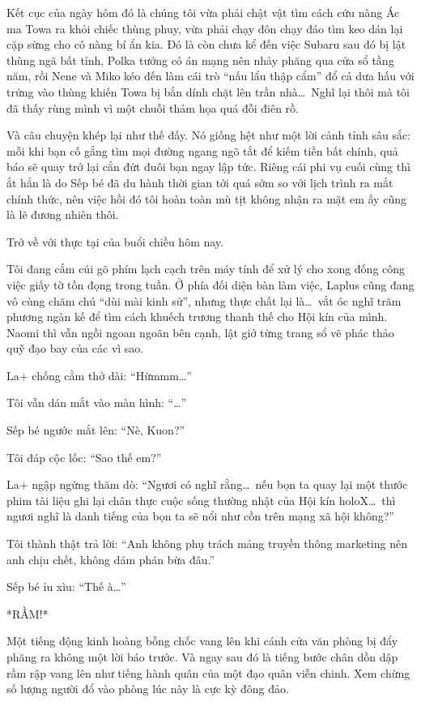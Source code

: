 \documentclass[../main.tex]{subfiles}
\begin{document}
Kết cục của ngày hôm đó là chúng tôi vừa phải chật vật tìm cách cứu nàng Ác ma Towa ra khỏi chiếc thùng phuy, vừa phải chạy đôn chạy đáo tìm keo dán lại cặp sừng cho cô nàng bí ẩn kia. Đó là còn chưa kể đến việc Subaru sau đó bị lật thùng ngã bất tỉnh, Polka tưởng có án mạng nên nhảy phăng qua cửa sổ tầng năm, rồi Nene và Miko kéo đến làm cái trò ``nấu lẩu thập cẩm'' đổ cả dưa hấu với trứng vào thùng khiến Towa bị bắn dính chặt lên trần nhà\dots\ Nghĩ lại thôi mà tôi đã thấy rùng mình vì một chuỗi thảm họa quá đỗi điên rồ.

\il

Và câu chuyện khép lại như thế đấy. Nó giống hệt như một lời cảnh tỉnh sâu sắc: mỗi khi bạn cố gắng tìm mọi đường ngang ngõ tắt để kiếm tiền bất chính, quả báo sẽ quay trở lại cắn đứt đuôi bạn ngay lập tức. Riêng cái phi vụ cuối cùng thì ắt hẳn là do Sếp bé đã du hành thời gian tới quá sớm so với lịch trình ra mắt chính thức, nên việc hồi đó tôi hoàn toàn mù tịt không nhận ra mặt em ấy cũng là lẽ đương nhiên thôi.

\ct

Trở về với thực tại của buổi chiều hôm nay.

Tôi đang cắm cúi gõ phím lạch cạch trên máy tính để xử lý cho xong đống công việc giấy tờ tồn đọng trong tuần. Ở phía đối diện bàn làm việc, Laplus cũng đang vô cùng chăm chú ``dùi mài kinh sử'', nhưng thực chất lại là\dots\ vắt óc nghĩ trăm phương ngàn kế để tìm cách khuếch trương thanh thế cho Hội kín của mình. Naomi thì vẫn ngồi ngoan ngoãn bên cạnh, lật giở từng trang sổ vẽ phác thảo quỹ đạo bay của các vì sao.

La+ chống cằm thở dài: ``Hừmmm\dots''

Tôi vẫn dán mắt vào màn hình: ``\dots''

Sếp bé ngước mắt lên: ``Nè, Kuon?''

Tôi đáp cộc lốc: ``Sao thế em?''

La+ ngập ngừng thăm dò: ``Ngươi có nghĩ rằng\dots\ nếu bọn ta quay lại một thước phim tài liệu ghi lại chân thực cuộc sống thường nhật của Hội kín holoX\dots\ thì ngươi nghĩ là danh tiếng của bọn ta sẽ nổi như cồn trên mạng xã hội không?''

Tôi thành thật trả lời: ``Anh không phụ trách mảng truyền thông marketing nên anh chịu chết, không dám phán bừa đâu.''

Sếp bé ỉu xìu: ``Thế à\dots''

*RẦM!*

Một tiếng động kinh hoàng bỗng chốc vang lên khi cánh cửa văn phòng bị đẩy phăng ra không một lời báo trước. Và ngay sau đó là tiếng bước chân dồn dập rầm rập vang lên như tiếng hành quân của một đạo quân viễn chinh. Xem chừng số lượng người đổ vào phòng lúc này là cực kỳ đông đảo.
\end{document}
